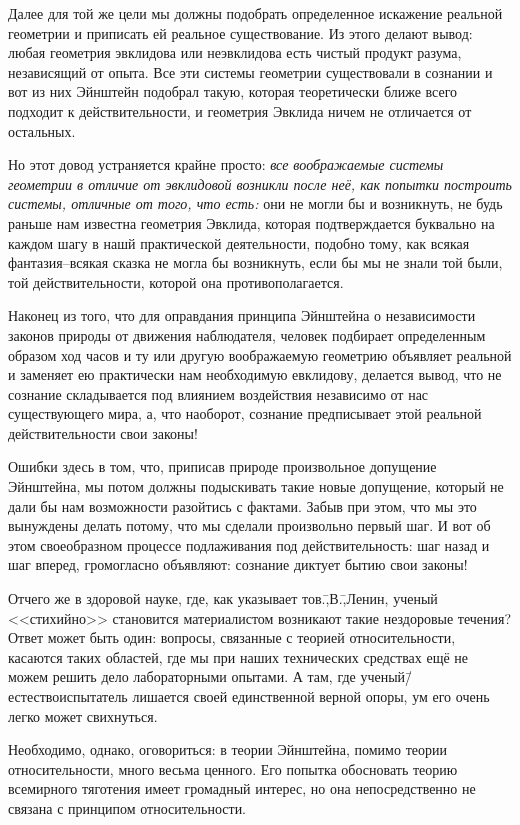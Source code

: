 Далее для той же цели мы должны подобрать определенное искажение реальной геометрии и приписать ей реальное существование. Из этого делают вывод: любая геометрия эвклидова или неэвклидова есть чистый продукт разума, независящий от опыта. Все эти системы геометрии существовали в сознании и вот из них Эйнштейн подобрал такую, которая теоретически ближе всего подходит к действительности, и геометрия Эвклида ничем не отличается от остальных.

Но этот довод устраняется крайне просто: \emph{все воображаемые системы геометрии в отличие от эвклидовой возникли после неё, как попытки построить системы, отличные от того, что есть:} они не могли бы и возникнуть, не будь раньше нам известна геометрия Эвклида, которая подтверждается буквально на каждом шагу в нашй практической деятельности, подобно тому, как всякая фантазия\---всякая сказка не могла бы возникнуть, если бы мы не знали той были, той действительности, которой она противополагается.

Наконец из того, что для оправдания принципа Эйнштейна о независимости законов природы от движения наблюдателя, человек подбирает определенным образом ход часов и ту или другую воображаемую геометрию объявляет реальной и заменяет ею практически нам необходимую евклидову, делается вывод, что не сознание складывается под влиянием воздействия независимо от нас существующего мира, а, что наоборот, сознание предписывает этой реальной действительности свои законы!

Ошибки здесь в том, что, приписав природе произвольное допущение Эйнштейна, мы потом должны подыскивать такие новые допущение, который не дали бы нам возможности разойтись с фактами. Забыв при этом, что мы это вынуждены делать потому, что мы сделали произвольно первый шаг. И вот об этом своеобразном процессе подлаживания под действительность: шаг назад и шаг вперед, громогласно объявляют: сознание диктует бытию свои законы!

Отчего же в здоровой науке, где, как указывает тов.\=,В.\=,Ленин, ученый <<стихийно>> становится материалистом возникают такие нездоровые течения? Ответ может быть один: вопросы, связанные с теорией относительности, касаются таких областей, где мы при наших технических средствах ещё не можем решить дело лабораторными опытами. А там, где ученый\=/естествоиспытатель лишается своей единственной верной опоры, ум его очень легко может свихнуться.

Необходимо, однако, оговориться: в теории Эйнштейна, помимо теории относительности, много весьма ценного. Его попытка обосновать теорию всемирного тяготения имеет громадный интерес, но она непосредственно не связана с принципом относительности.

